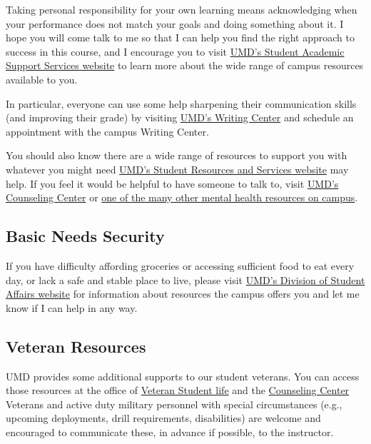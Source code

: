 \documentclass[11pt]{article}
\begin{document}
Taking personal responsibility for your own learning means acknowledging
when your performance does not match your goals and doing something
about it. I hope you will come talk to me so that I can help you find
the right approach to success in this course, and I encourage you to
visit \href{http://tutoring.umd.edu}{UMD's Student Academic Support
Services website} to learn more about the wide range of campus resources
available to you.

In particular, everyone can use some help sharpening their communication
skills (and improving their grade) by visiting
\href{http://www.english.umd.edu/academics/writingcenter/schedule}{UMD's
Writing Center} and schedule an appointment with the campus Writing
Center.

You should also know there are a wide range of resources to support you
with whatever you might need
\href{https://sph.umd.edu/content/student-resources-and-services}{UMD's
Student Resources and Services website} may help. If you feel it would
be helpful to have someone to talk to, visit
\href{https://www.counseling.umd.edu/}{UMD's Counseling Center} or
\href{https://tltc.umd.edu/instructors/teaching-topics/supporting-whole-student}{one
of the many other mental health resources on campus}.

\hypertarget{basic-needs-security}{%
\subsection{Basic Needs Security}\label{basic-needs-security}}

If you have difficulty affording groceries or accessing sufficient food
to eat every day, or lack a safe and stable place to live, please visit
\href{https://studentaffairs.umd.edu/basic-needs-security}{UMD's
Division of Student Affairs website} for information about resources the
campus offers you and let me know if I can help in any way.

\hypertarget{veteran-resources}{%
\subsection{Veteran Resources}\label{veteran-resources}}

UMD provides some additional supports to our student veterans. You can
access those resources at the office of
\href{https://stamp.umd.edu/engagement/veteran_student_life}{Veteran
Student life} and the
\href{https://www.counseling.umd.edu/aboutus/}{Counseling Center}
Veterans and active duty military personnel with special circumstances
(e.g., upcoming deployments, drill requirements, disabilities) are
welcome and encouraged to communicate these, in advance if possible, to
the instructor.
\end{document}
